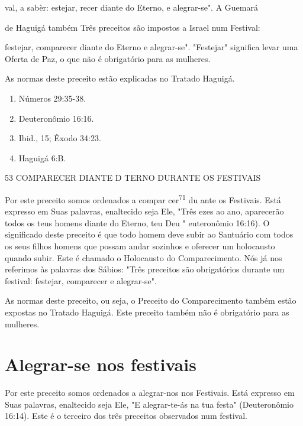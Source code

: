 \begin{itemize}
\begin{enumrate}
\begin{itemize}
\begin{itemize}
val, a sabèr: estejar, recer diante do Eterno, e alegrar-se". A Guemará

de Haguigá também Três preceitos são impostos a Israel num Festival:

festejar, comparecer diante do Eterno e alegrar-se". "Festejar"
significa levar uma Oferta de Paz, o que não é obrigatório para as
mulheres.

As normas deste preceito estão explicadas no Tratado Haguigá.


\begin{enumerate}
\def\labelenumi{\arabic{enumi}.}
\setcounter{enumi}{66}
\item
 
 Números 29:35-38.
 
\item
 
 Deuteronômio 16:16.
 
\item
 
 Ibid., 15; Êxodo 34:23.
 
\item
 
 Haguigá 6:B.
 
\end{enumerate}

53 COMPARECER DIANTE D TERNO DURANTE OS FESTIVAIS

Por este preceito somos ordenados a compar cer\textsuperscript{71} du
ante os Fes­tivais. Está expresso em Suas palavras, enaltecido seja Ele,
"Três ezes ao ano, aparecerão todos os teus homens diante do Eterno, teu
Deu " euteronômio 16:16). O significado deste preceito é que todo homem
deve subir ao Santuá­rio com todos os seus filhos homens que possam
andar sozinhos e oferecer um holocausto quando subir. Este é chamado o
Holocausto do Comparecimento. Nós já nos referimos às palavras dos
Sábios: "Três preceitos são obrigatórios durante um festival: festejar,
comparecer e alegrar-se".

As normas deste preceito, ou seja, o Preceito do Comparecimento também
estão expostas no Tratado Haguigá. Este preceito também não é
obri­gatório para as mulheres.

\section{Alegrar-se nos festivais}

Por este preceito somos ordenados a alegrar-nos nos Festivais. Está
expresso em Suas palavras, enaltecido seja Ele, "E alegrar-te-ás na tua
festa" (Deuteronômio 16:14). Este é o terceiro dos três preceitos
observados num festival.


\end{itemize}
\end{itemize}
\end{enumrate}
\end{itemize}
